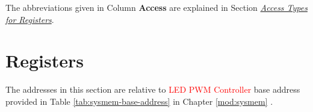 \documentclass[main\_\_EN.tex]{subfiles}
\begin{document}
The abbreviations given in Column \textbf{Access} are explained in Section \hyperref[glossary-access-types]{\textit{Access Types for Registers}}.






\clearpage
\section{Registers}

The addresses in this section are relative to \textcolor{red}{LED PWM Controller} base address provided in Table \ref{tab:sysmem-base-address} in Chapter \ref{mod:sysmem} \textit{}.


\end{document}
